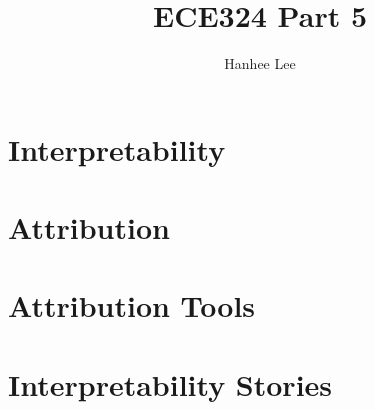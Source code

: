 \documentclass{article}
\title{ECE324 Part 5}
\author{Hanhee Lee}
\begin{document}
\section{Interpretability}

\newpage

\section{Attribution}

\newpage

\section{Attribution Tools}

\newpage

\section{Interpretability Stories}

\end{document}
